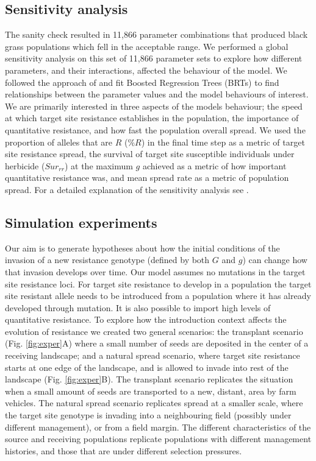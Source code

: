 \documentclass[10pt,letterpaper]{article}
\begin{document}
\subsection*{Sensitivity analysis}
The sanity check resulted in 11,866 parameter combinations that produced black grass populations which fell in the acceptable range. We performed a global sensitivity analysis on this set of 11,866 parameter sets to explore how different parameters, and their interactions, affected the behaviour of the model. We followed the approach of \cite{Cout2014} and fit Boosted Regression Trees (BRTs) to find relationships between the parameter values and the model behaviours of interest. We are primarily interested in three aspects of the models behaviour; the speed at which target site resistance establishes in the population, the importance of quantitative resistance, and how fast the population overall spread. We used the proportion of alleles that are $R$ (\%$R$) in the final time step as a metric of target site resistance spread, the survival of target site susceptible individuals under herbicide ($Sur_{rr}$) at the maximum $g$ achieved as a metric of how important quantitative resistance was, and mean spread rate as a metric of population spread. For a detailed explanation of the sensitivity analysis see .

\subsection*{Simulation experiments}
Our aim is to generate hypotheses about how the initial conditions of the invasion of a new resistance genotype (defined by both $G$ and $g$) can change how that invasion develops over time. Our model assumes no mutations in the target site resistance loci. For target site resistance to develop in a population the target site resistant allele needs to be introduced from a population where it has already developed through mutation. It is also possible to import high levels of quantitative resistance. To explore how the introduction context affects the evolution of resistance we created two general scenarios: the transplant scenario (Fig. \ref{fig:exper}A) where a small number of seeds are deposited in the center of a receiving landscape; and a natural spread scenario, where target site resistance starts at one edge of the landscape, and is allowed to invade into rest of the landscape (Fig. \ref{fig:exper}B). The transplant scenario replicates the situation when a small amount of seeds are transported to a new, distant, area by farm vehicles. The natural spread scenario replicates spread at a smaller scale, where the target site genotype is invading into a neighbouring field (possibly under different management), or from a field margin. The different characteristics of the source and receiving populations replicate populations with different management histories, and those that are under different selection pressures.     
\end{document}
